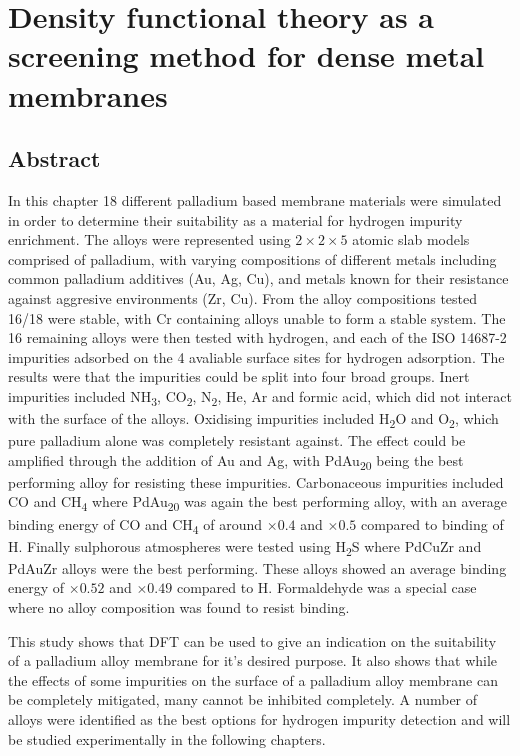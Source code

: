 \chapter{Density functional theory as a screening method for dense metal membranes}

\section{Abstract}
In this chapter 18 different palladium based membrane materials were simulated in order to determine their suitability as a material for hydrogen impurity enrichment. The alloys were represented using $2\times 2\times 5$ atomic slab models comprised of palladium, with varying compositions of different metals including common palladium additives (Au, Ag, Cu), and metals known for their resistance against aggresive environments (Zr, Cu). From the alloy compositions tested 16/18 were stable, with Cr containing alloys unable to form a stable system. The 16 remaining alloys were then tested with hydrogen, and each of the ISO 14687-2 impurities adsorbed on the 4 avaliable surface sites for hydrogen adsorption. The results were that the impurities could be split into four broad groups. Inert impurities included NH\textsubscript{3}, CO\textsubscript{2}, N\textsubscript{2}, He, Ar and formic acid, which did not interact with the surface of the alloys. Oxidising impurities included H\textsubscript{2}O and O\textsubscript{2}, which pure palladium alone was completely resistant against. The effect could be amplified through the addition of Au and Ag, with PdAu\textsubscript{20} being the best performing alloy for resisting these impurities. Carbonaceous impurities included CO and CH\textsubscript{4} where PdAu\textsubscript{20} was again the best performing alloy, with an average binding energy of CO and CH\textsubscript{4} of around $\times 0.4$ and $\times 0.5$ compared to binding of H. Finally sulphorous atmospheres were tested using H\textsubscript{2}S where PdCuZr and PdAuZr alloys were the best performing. These alloys showed an average binding energy of $\times 0.52$ and $\times 0.49$ compared to H. Formaldehyde was a special case where no alloy composition was found to resist binding. 

This study shows that DFT can be used to give an indication on the suitability of a palladium alloy membrane for it's desired purpose. It also shows that while the effects of some impurities on the surface of a palladium alloy membrane can be completely mitigated, many cannot be inhibited completely. A number of alloys were identified as the best options for hydrogen impurity detection and will be studied experimentally in the following chapters.

